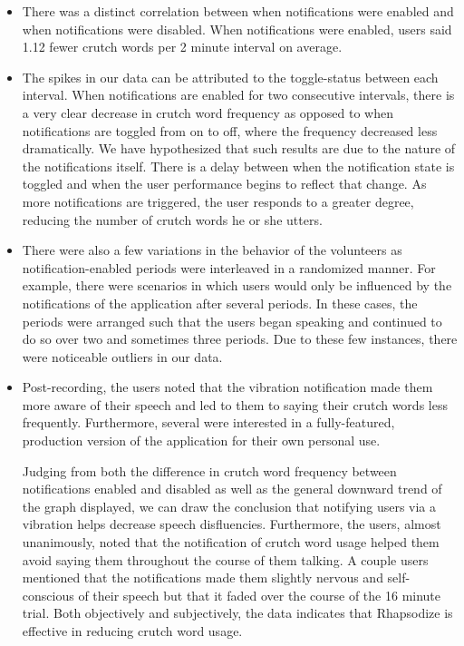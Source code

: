\documentclass{sigchi}
\begin{document}
\begin{itemize}
\item There was a distinct correlation between when notifications were enabled and when notifications were disabled. When notifications were enabled, users said 1.12 fewer crutch words per 2 minute interval on average.
\item The spikes in our data can be attributed to the toggle-status between each interval. When notifications are enabled for two consecutive intervals, there is a very clear decrease in crutch word frequency as opposed to when notifications are toggled from on to off, where the frequency decreased less dramatically. We have hypothesized that such results are due to the nature of the notifications itself. There is a delay between when the notification state is toggled and when the user performance begins to reflect that change. As more notifications are triggered, the user responds to a greater degree, reducing the number of crutch words he or she utters.
\item There were also a few variations in the behavior of the volunteers as notification-enabled periods were interleaved in a randomized manner. For example, there were scenarios in which users would only be influenced by the notifications of the application after several periods. In these cases, the periods were arranged such that the users began speaking and continued to do so over two and sometimes three periods. Due to these few instances, there were noticeable outliers in our data.
\item Post-recording, the users noted that the vibration notification made them more aware of their speech and led to them to saying their crutch words less frequently. Furthermore, several were interested in a fully-featured, production version of the application for their own personal use.

Judging from both the difference in crutch word frequency between notifications enabled and disabled as well as the general downward trend of the graph displayed, we can draw the conclusion that notifying users via  a vibration helps decrease speech disfluencies. Furthermore, the users, almost unanimously, noted that the notification of crutch word usage helped them avoid saying them throughout the course of them talking. A couple users mentioned that the notifications made them slightly nervous and self-conscious of their speech but that it faded over the course of the 16 minute trial. Both objectively and subjectively, the data indicates that Rhapsodize is effective in reducing crutch word usage.
\end{itemize}
\end{document}
